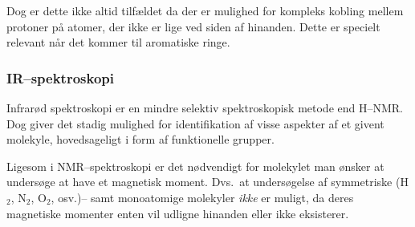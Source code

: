     Dog er dette ikke altid tilfældet da der er mulighed for kompleks kobling mellem protoner på atomer, der ikke er lige ved siden af hinanden. Dette er specielt relevant når det kommer til aromatiske ringe.

    \subsubsection{IR--spektroskopi}
    Infrarød spektroskopi er en mindre selektiv spektroskopisk metode end H--NMR. Dog giver det stadig mulighed for identifikation af visse aspekter af et givent molekyle, hovedsageligt i form af funktionelle grupper.

    Ligesom i NMR--spektroskopi er det nødvendigt for molekylet man ønsker at undersøge at have et magnetisk moment. Dvs.\ at undersøgelse af symmetriske (H$_2$, N$_2$, O$_2$, osv.)-- samt monoatomige molekyler \textit{ikke} er muligt, da deres magnetiske momenter enten vil udligne hinanden eller ikke eksisterer.

